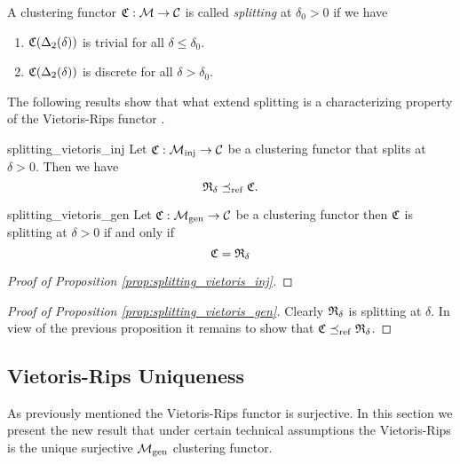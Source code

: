 \begin{definition}{}{}
    A clustering functor $\mathfrak{C}: \mathcal{M} \to \mathcal{C}$ is called \emph{splitting} at $\delta_0 > 0$ if we have
    \begin{enumerate}
        \item $\mathfrak{C}(\Delta_2(\delta))$ is trivial for all $\delta \leq \delta_0$.
        \item $\mathfrak{C}(\Delta_2(\delta))$ is discrete for all $\delta > \delta_0$.
    \end{enumerate}
\end{definition}



The following results show that what extend splitting is a characterizing property of the Vietoris-Rips functor \cite[Theorem~6.4]{Carlsson2010}.

\begin{proposition}{}{splitting_vietoris_inj}
    Let $\mathfrak{C}: {\mathcal{M}_\mathrm{inj}} \to \mathcal{C}$ be a clustering functor that splits at $\delta > 0$. Then we have 
    $$
    \mathfrak{R}_\delta \preceq_\mathrm{ref} \mathfrak{C}.
    $$
\end{proposition}


\begin{proposition}{\source}{splitting_vietoris_gen}
    Let $\mathfrak{C}: {\mathcal{M}_\mathrm{gen}} \to \mathcal{C}$ be a clustering functor then $\mathfrak{C}$ is splitting at $\delta > 0$ if and only if 
    $$
    \mathfrak{C} = \mathfrak{R}_\delta
    $$
\end{proposition}

\begin{proof}[Proof of Proposition \ref{prop:splitting_vietoris_inj}]
    \todo[]
\end{proof}

\begin{proof}[Proof of Proposition \ref{prop:splitting_vietoris_gen}]
    Clearly $\mathfrak{R}_\delta$ is splitting at $\delta$. In view of the previous proposition it remains to show that $\mathfrak{C} \preceq_\mathrm{ref} \mathfrak{R}_\delta$.

    \todo[]
\end{proof}

\subsection[Vietoris-Rips Uniqueness]{Vietoris-Rips Uniqueness \newresult[]}

As previously mentioned the Vietoris-Rips functor is surjective.
In this section we present the new result that under certain technical assumptions the Vietoris-Rips is the unique surjective ${\mathcal{M}_\mathrm{gen}}$ clustering functor.

